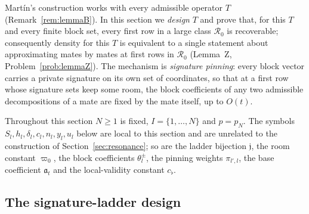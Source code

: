 \documentclass[10pt]{amsart}
\theoremstyle{definition}
\theoremstyle{remark}
\begin{document}
Mart\'in's construction works with every admissible operator $T$
(Remark~\ref{rem:lemmaB}).  In this section we \emph{design} $T$ and prove
that, for this $T$ and every finite block set, every first row in a large
class $\mathcal R_0$ is recoverable; consequently density for this $T$ is
equivalent to a single statement about approximating mates by mates at
first rows in $\mathcal R_0$ (Lemma~Z, Problem~\ref{prob:lemmaZ}).  The
mechanism is \emph{signature pinning}: every block vector carries a private
signature on its own set of coordinates, so that at a first row whose
signature sets keep some room, the block coefficients of any two admissible
decompositions of a mate are fixed by the mate itself, up to $O(t)$.

Throughout this section $N\ge1$ is fixed, $I=\{1,\dots,N\}$ and $p=p_N$.
The symbols $S_l,h_l,\delta_l,c_l,n_l,y_l,u_l$ below are local to this
section and are unrelated to the construction of
Section~\ref{sec:resonance}; so are the ladder bijection $\mathfrak j$, the
room constant $\varpi_0$, the block coefficients $\theta^\pm_l$, the
pinning weights $\pi_{l',l}$, the base coefficient $\mathfrak a_t$ and the
local-validity constant $c_\flat$.

\subsection{The signature-ladder design}
\end{document}
